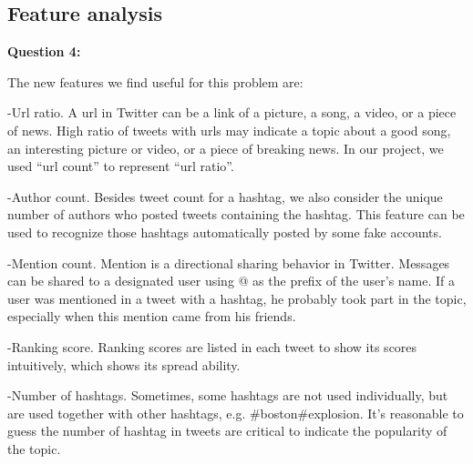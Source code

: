 \documentclass{article}
\begin{document}
\bigbreak
\subsection{Feature analysis}
\textbf{Question 4:}

The new features we find useful for this problem are:

-Url ratio. A url in Twitter can be a link of a picture, a song, a video, or a piece of news. High ratio of tweets with urls may indicate a topic about a good song, an interesting picture or video, or a piece of breaking news. In our project, we used “url count” to represent “url ratio”.

-Author count. Besides tweet count for a hashtag, we also consider the unique number of authors who posted tweets containing the hashtag. This feature can be used to recognize those hashtags automatically posted by some fake accounts.

-Mention count. Mention is a directional sharing behavior in Twitter. Messages can be shared to a designated user using @ as the prefix of the user’s name. If a user was mentioned in a tweet with a hashtag, he probably took part in the topic, especially when this mention came from his friends.

-Ranking score. Ranking scores are listed in each tweet to show its scores intuitively, which
shows its spread ability.

-Number of hashtags. Sometimes, some hashtags are not used individually, but are used together with other hashtags, e.g. \#boston\#explosion. It's reasonable to guess the number of hashtag in tweets are critical to indicate the popularity of the topic.
\\

\begin{table}[h]
\center
\caption{MSE and R-squared measure(after adding new features)}
\label{Q4_11}
\end{table}
\end{document}

